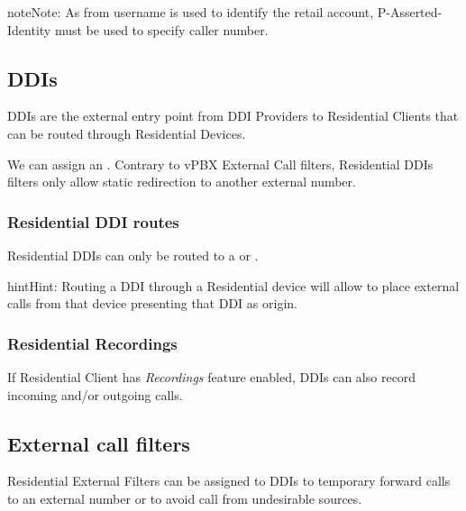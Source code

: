 \documentclass[letterpaper,10pt,english]{sphinxmanual}
\begin{document}
\begin{notice}{note}{Note:}
As from username is used to identify the retail account, P-Asserted-Identity must be used to specify caller number.
\end{notice}


\subsection{DDIs}
\label{administration_portal/client/residential/ddis:ddis}\label{administration_portal/client/residential/ddis:residential-ddis}\label{administration_portal/client/residential/ddis::doc}
DDIs are the external entry point from DDI Providers to Residential Clients that
can be routed through Residential Devices.

We can assign an {\hyperref[administration_portal/client/vpbx/routing_tools/external_call_filters:external\string-call\string-filters]{}}. Contrary to vPBX External Call filters, Residential DDIs
filters only allow static redirection to another external number.


\subsubsection{Residential DDI routes}
\label{administration_portal/client/residential/ddis:residential-ddi-routes}
Residential DDIs can only be routed to a {\hyperref[administration_portal/client/residential/residential_devices:residential\string-devices]{}}
or {\hyperref[administration_portal/client/vpbx/faxes:faxing\string-system]{}}.

\begin{notice}{hint}{Hint:}
Routing a DDI through a Residential device will allow to place external calls
from that device presenting that DDI as origin.
\end{notice}


\subsubsection{Residential Recordings}
\label{administration_portal/client/residential/ddis:residential-recordings}
If Residential Client has \emph{Recordings} feature enabled, DDIs can also record incoming and/or
outgoing calls.


\subsection{External call filters}
\label{administration_portal/client/residential/external_call_filters:external-call-filters}\label{administration_portal/client/residential/external_call_filters:residential-filters}\label{administration_portal/client/residential/external_call_filters::doc}
Residential External Filters can be assigned to DDIs to temporary
forward calls to an external number or to avoid call from undesirable sources.
\end{document}
